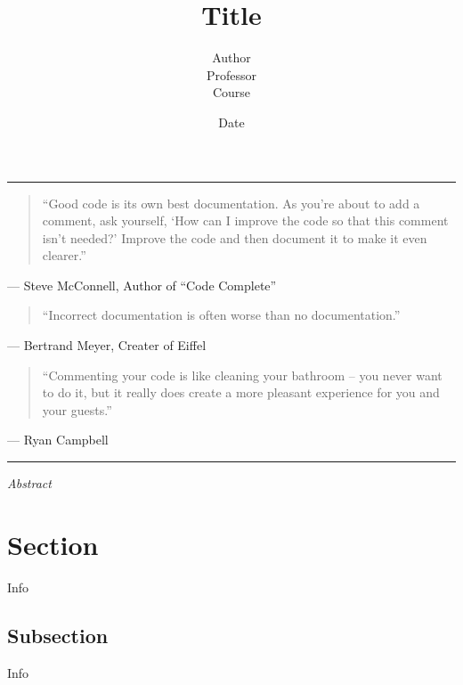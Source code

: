 \documentclass[11pt, twocolumn]{article}
\title{\LARGE \bf
Title\\
}
\author{Author\\
Professor\\
Course}
\date{Date}
\begin{document}
\onecolumn

\maketitle

\hrule
\bigskip
\bigskip
\begin{quotation}
``Good code is its own best documentation. As you're about to add a comment, ask yourself, `How can I improve the code so that this comment isn't needed?' Improve the code and then document it to make it even clearer.''
\end{quotation}
\begin{flushright}
--- Steve McConnell, Author of ``Code Complete''
\end{flushright}
\bigskip
\bigskip
\begin{quotation}
``Incorrect documentation is often worse than no documentation.''
\end{quotation}
\begin{flushright}
--- Bertrand Meyer, Creater of Eiffel
\end{flushright}
\bigskip
\bigskip
\begin{quotation}
``Commenting your code is like cleaning your bathroom -- you never want to do it, but it really does create a more pleasant experience for you and your guests.''
\end{quotation}
\begin{flushright}
--- Ryan Campbell
\end{flushright}
\bigskip
\bigskip
\hrule

\pagebreak
\tableofcontents
\bigskip
\bigskip
\bigskip
\bigskip
\bigskip
\bigskip
\pagebreak

\setlength\columnsep{30pt}
\twocolumn

\textit{Abstract}

\section{Section}
\label{ref:section_ref}
\hspace{10mm} Info

\subsection{Subsection}
\label{ref:subsection_ref}
\hspace{10mm} Info
\end{document}
